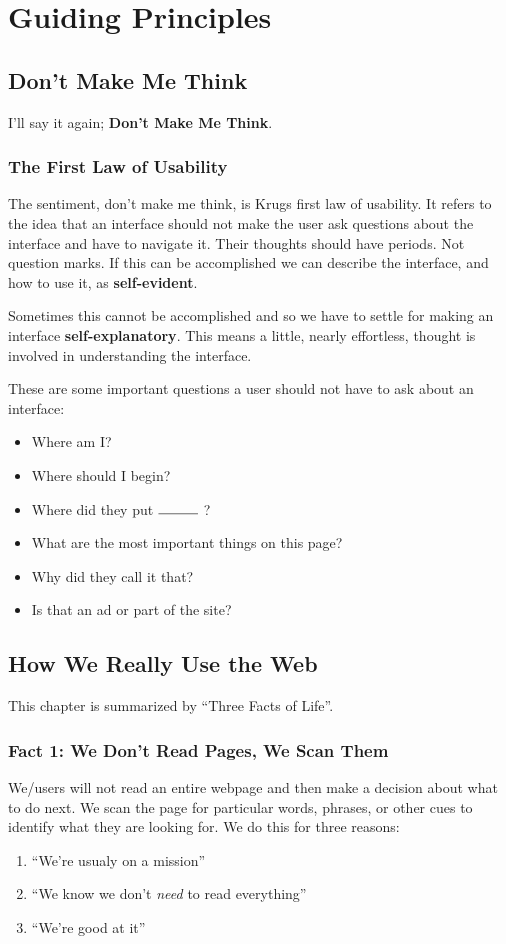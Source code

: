 \documentclass{article}%
\begin{document}
%
\section{Guiding Principles}%
\label{sec:Guiding Principles}%
\subsection{Don't Make Me Think}
I'll say it again; \textbf{Don't Make Me Think}.
  \subsubsection{The First Law of Usability}
  The sentiment, don't make me think, is Krugs first law of usability.
  It refers to the idea that an interface should not make the user ask questions
  about the interface and have to navigate it. Their thoughts should have periods.
  Not question marks. If this can be accomplished we can describe the interface, and how to use it,
  as \textbf{self-evident}. \newline

  Sometimes this cannot be accomplished and so we have to settle for making an
  interface \textbf{self-explanatory}. This means a little, nearly effortless, thought
  is involved in understanding the interface.
  \newline

  These are some important questions a user should not have to ask about an interface:
  \begin{itemize}
    \item Where am I?
    \item Where should I begin?
    \item Where did they put $\rule{1cm}{0.15mm}$ ?
    \item What are the most important things on this page?
    \item Why did they call it that?
    \item Is that an ad or part of the site?
  \end{itemize}

\subsection{How We Really Use the Web}
This chapter is summarized by ``Three Facts of Life''.
  \subsubsection{Fact 1: We Don't Read Pages, We Scan Them}
    We\slash users will not read an entire webpage and then make a decision
    about what to do next. We scan the page for particular words, phrases, or
    other cues to identify what they are looking for. \newline
    We do this for three reasons:
    \begin{enumerate}
      \item ``We're usualy on a mission''
      \item ``We know we don't \emph{need} to read everything''
      \item ``We're good at it''
    \end{enumerate}
\end{document}
